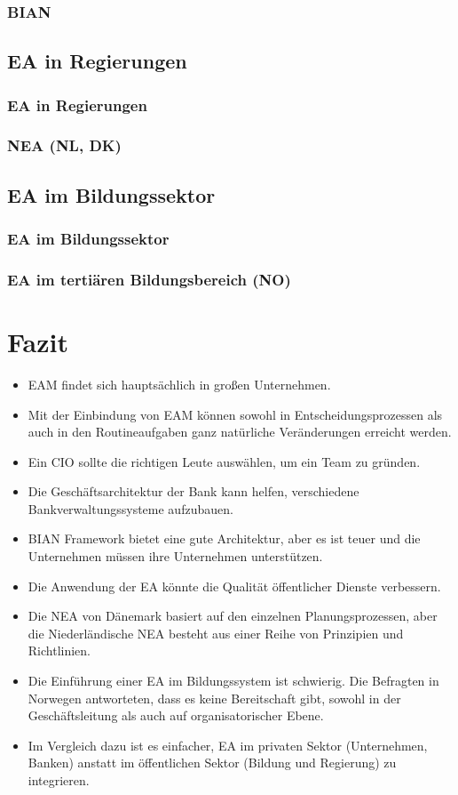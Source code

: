 \documentclass[
	A4paper,
	DIV=9,
	BCOR7mm,
	smallheadings,
	headinclude,
	footinclude,
	headsepline,
	parindent,
	german,
	captions=tableheading,
	abstracton
	]{scrreprt}
\begin{document}
\subsection{BIAN}
\section{EA in Regierungen}
\subsection{EA in Regierungen}
\subsection{NEA (NL, DK)}
\section{EA im Bildungssektor}
\subsection{EA im Bildungssektor}
\subsection{EA im tertiären Bildungsbereich (NO)}

\chapter{Fazit}
\begin{itemize}
\item EAM findet sich hauptsächlich in großen Unternehmen.
\item Mit der Einbindung von EAM können sowohl in Entscheidungsprozessen als auch in den Routineaufgaben ganz natürliche Veränderungen erreicht werden.
\item Ein CIO sollte die richtigen Leute auswählen, um ein Team zu gründen.
\item Die Geschäftsarchitektur der Bank kann helfen, verschiedene Bankverwaltungssysteme aufzubauen.
\item BIAN Framework bietet eine gute Architektur, aber es ist teuer und die Unternehmen müssen ihre Unternehmen unterstützen.
\item Die Anwendung der EA könnte die Qualität öffentlicher Dienste verbessern. \item Die NEA von Dänemark basiert auf den einzelnen Planungsprozessen, aber die Niederländische NEA besteht aus einer Reihe von Prinzipien und Richtlinien.
\item Die Einführung einer EA im Bildungssystem ist schwierig. Die Befragten in Norwegen antworteten, dass es keine Bereitschaft gibt, sowohl in der Geschäftsleitung als auch auf organisatorischer Ebene.
\item Im Vergleich dazu ist es einfacher, EA im privaten Sektor (Unternehmen, Banken) anstatt im öffentlichen Sektor (Bildung und Regierung) zu integrieren.
\end{itemize}

\printbibliography
\end{document}
